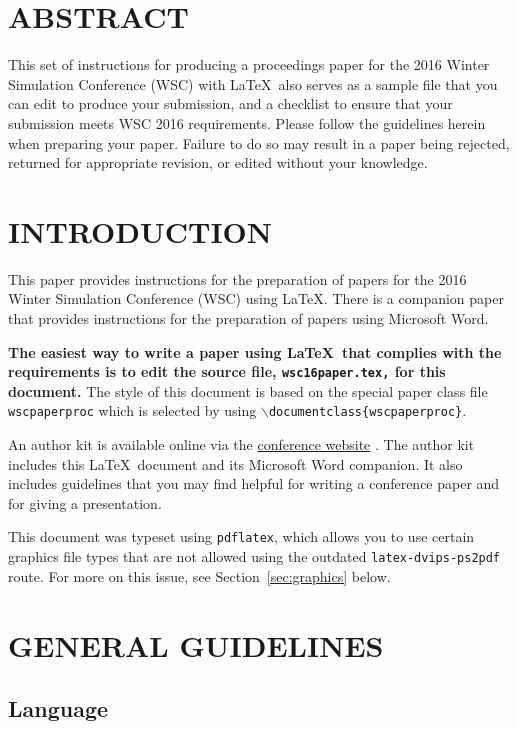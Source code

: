 \documentclass{wscpaperproc}
\theoremstyle{wsc}
\begin{document}
\section*{ABSTRACT}
This set of instructions for producing a proceedings paper for the 2016
Winter Simulation Conference (WSC) with \LaTeX\ also serves as a sample file that you can edit to
produce your submission, and a checklist to ensure that your submission
meets WSC 2016 requirements. Please follow the guidelines herein when preparing your
paper. Failure to do so may result in a paper being rejected, returned for
appropriate revision, or edited without your knowledge.

\section{INTRODUCTION}
\label{sec:intro}

This paper provides instructions for the preparation of papers for the 2016
Winter Simulation Conference (WSC) using \LaTeX. There is a companion paper that
provides instructions for the preparation of papers using Microsoft Word.

\textbf{The easiest way to write a paper using \LaTeX\ that complies with the
requirements is to edit the source file, {\tt wsc16paper.tex,} for this document.}
The style of this document is based on the special paper class file {\tt wscpaperproc} which is selected by using {\tt $\backslash$documentclass\{wscpaperproc\}}.

An author kit is available online via the  \href{http://www.wintersim.org}%
{conference website} \cite{WSC}.
The author kit includes this \LaTeX\ document and its Microsoft Word companion.
It also includes guidelines that you may find helpful for writing a conference paper and for giving a presentation.

This document was typeset using {\tt pdflatex}, which allows you to use certain
graphics file types that are not allowed using the outdated {\tt latex-dvips-ps2pdf} route.
For more on this issue, see Section~\ref{sec:graphics} below.

\section{GENERAL GUIDELINES}

\subsection{Language}
\end{document}
